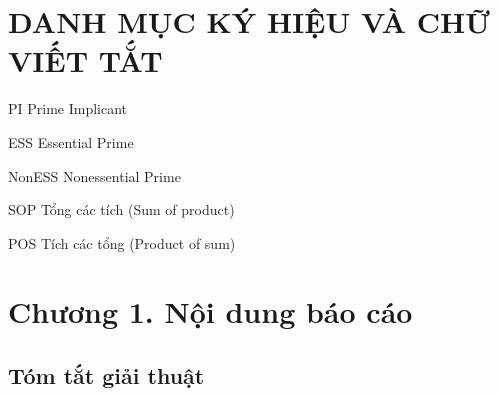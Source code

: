 \documentclass[titlepage]{article} %
\begin{document}
\pagestyle{empty} %
\tableofcontents
\thispagestyle{empty}
\cleardoublepage

\pagestyle{plain} %
\section*{\centering DANH MỤC KÝ HIỆU VÀ CHỮ VIẾT TẮT}
\begin{abbrv}
\item[PI] Prime Implicant
\item[ESS] Essential Prime
\item[NonESS] Nonessential Prime
\item[SOP] Tổng các tích (Sum of product)
\item[POS] Tích các tổng (Product of sum)
\end{abbrv}
\cleardoublepage


\listoffigures
{}
\cleardoublepage







\setcounter{section}{1}
\setcounter{subsection}{0}
\section*{\centering  Chương 1. Nội dung báo cáo}
\subsection{Tóm tắt giải thuật}
\end{document}
